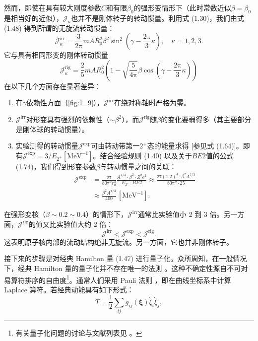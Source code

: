 然而，即使在具有较大刚度参数$C$和有限$\beta_{0}$的强形变情形下（此时常数近似$\beta=\beta_{0}$是相当好的近似），$\mathcal{J}_{\kappa}$也并不是刚体转子的转动惯量。利用式
(1.30)，我们由式 (1.48) 得到所谓的无旋流转动惯量：
\[
\mathcal{J}^{\text{irr}}_{\kappa}=\frac{3}{2\mathrm{\pi}}mAR^{2}_{0}\beta^{2}\sin^{2}\left(\gamma-\frac{2\mathrm{\pi}}{3}\kappa\right),\quad\kappa=1,2,3.
\]
它与具有相同形变的刚体转动惯量
\begin{equation}
\mathcal{J}^{\text{rig}}_{\kappa}=\frac{2}{5}mAR^{2}_{0}\left(1-\sqrt{\frac{5}{4\mathrm{\pi}}}\beta\cos\left(\gamma-\frac{2\mathrm{\pi}}{3}\kappa\right)\right)\label{eq:1.49}
\end{equation}
在以下几个方面存在显著差异：
\begin{enumerate}
\item 在$\gamma$依赖性方面（\ref{fig:1_9}），$\mathcal{J}^{\text{irr}}$在绕对称轴时严格为零。
\item $\mathcal{J}^{\text{irr}}$对形变具有强烈的依赖性（$\sim\beta^{2}$），而$\mathcal{J}^{\text{rig}}$随$\beta$的变化要弱得多（其主要部分是刚体球的转动惯量）。
\item 实验测得的转动惯量$\mathcal{J}^{\text{exp}}$可由转动带第一$2^{+}$态的能量求得 {[}参见式 (1.64){]}。即有$\mathcal{J}^{\text{exp}}=3/E_{2^{+}}$$[\text{MeV}^{-1}]$。结合经验规则
(1.40) 以及关于$BE2$值的公式 (1.74)，我们得到形变参数$\beta$与转动惯量之间的关联：
\begin{align}
\mathcal{J}^{\text{exp}} & =\frac{27}{80\mathrm{\pi}^{2}r^{4}_{0}}\frac{A^{4/3}\cdot\beta^{2}\cdot Z^{2}e^{2}}{E_{2^{+}}\cdot BE2}\approx\frac{27(1.2)^{4}\cdot\beta^{2}A^{7/3}}{80\mathrm{\pi}^{2}\cdot25}\nonumber \\
 & \approx\frac{\beta^{2}A^{7/3}}{400}\,[\text{MeV}^{-1}].\label{eq:1.50}
\end{align}
\end{enumerate}
在强形变核（$\beta\sim0.2\sim0.4$）的情形下，$\mathcal{J}^{\text{irr}}$通常比实验值小
2 到 3 倍。另一方面，$\mathcal{J}^{\text{rig}}$的值又比实验值大约 2 倍：
\begin{equation}
\mathcal{J}^{\text{irr}}<\mathcal{J}^{\text{exp}}<\mathcal{J}^{\text{rig}}.\label{eq:1.51}
\end{equation}
这表明原子核内部的流动结构绝非无旋流。另一方面，它也并非刚体转子。

接下来的步骤是对经典 Hamilton 量 (1.47) 进行量子化。众所周知，在一般情况下，经典 Hamilton 量的量子化并不存在唯一的法则
\cite{Me61}。这种不确定性源自不可对易算符排序的自由度\footnote{有关量子化问题的讨论与文献列表见 \cite{MD73}。}。通常人们采用
Pauli 法则 \cite{Pa33}，即在曲线坐标系中计算 Laplace 算符。若经典动能具有如下形式：
\begin{equation}
T=\frac{1}{2}\sum_{ij}g_{ij}(\boldsymbol{\xi})\dot{\xi}_{i}\dot{\xi}_{j},\label{eq:1.52}
\end{equation}

